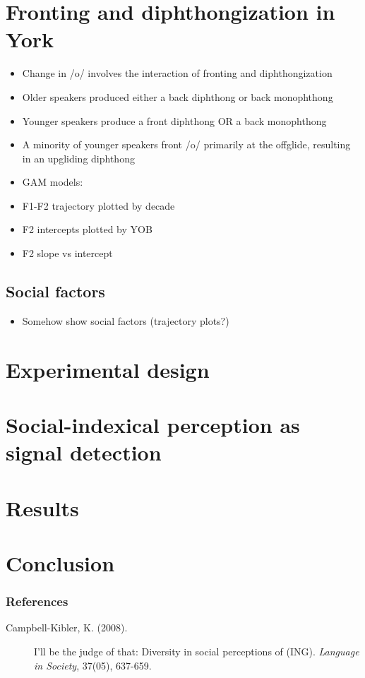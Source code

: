\documentclass[a0,final]{a0poster}
\begin{document}
\begin{multicols}{4}
\section*{Fronting and diphthongization in York}
\begin{itemize}
\item{Change in /o/ involves the interaction of fronting and diphthongization}
\item{Older speakers produced either a back diphthong or back monophthong}
\item{Younger speakers produce a front diphthong OR a back monophthong}
\item{A minority of younger speakers front /o/ primarily at the offglide, resulting in an upgliding diphthong}
\end{itemize}
\begin{itemize}
\item{GAM models:}
\item{F1-F2 trajectory plotted by decade}
\item{F2 intercepts plotted by YOB}
\item{F2 slope vs intercept}
\end{itemize}
\subsection*{Social factors}
\begin{itemize}
\item{Somehow show social factors (trajectory plots?)}
\end{itemize}
\columnbreak
\section*{Experimental design}
\section*{Social-indexical perception as signal detection}
\columnbreak
\section*{Results}
\section*{Conclusion}
\subsubsection*{References}
\vspace*{-.5cm}
\scriptsize
\begin{description}
\item[Campbell-Kibler, K. (2008).]{I'll be the judge of that: Diversity in social perceptions of (ING). \textit{Language in Society}, 37(05), 637-659.}\vspace*{0.2cm}


\end{description}
\end{multicols}
\end{document}
